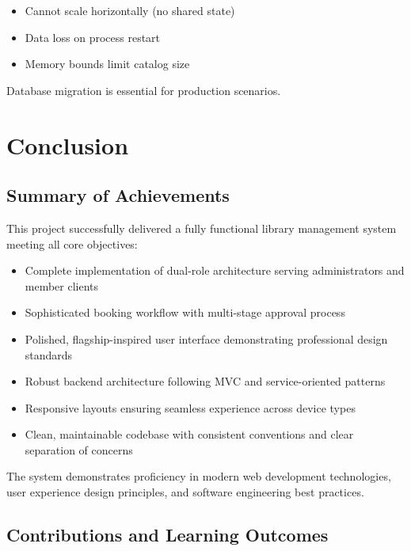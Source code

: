 \documentclass[12pt,a4paper]{article}
\begin{document}
\begin{itemize}[leftmargin=*]
    \item Cannot scale horizontally (no shared state)
    \item Data loss on process restart
    \item Memory bounds limit catalog size
\end{itemize}

Database migration is essential for production scenarios.

\newpage
\section{Conclusion}

\subsection{Summary of Achievements}

This project successfully delivered a fully functional library management system meeting all core objectives:

\begin{itemize}[leftmargin=*]
    \item Complete implementation of dual-role architecture serving administrators and member clients
    \item Sophisticated booking workflow with multi-stage approval process
    \item Polished, flagship-inspired user interface demonstrating professional design standards
    \item Robust backend architecture following MVC and service-oriented patterns
    \item Responsive layouts ensuring seamless experience across device types
    \item Clean, maintainable codebase with consistent conventions and clear separation of concerns
\end{itemize}

The system demonstrates proficiency in modern web development technologies, user experience design principles, and software engineering best practices.

\subsection{Contributions and Learning Outcomes}
\end{document}

